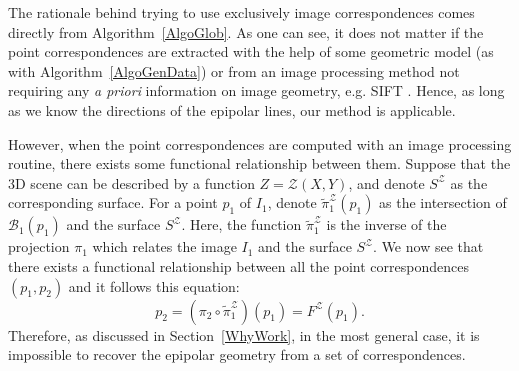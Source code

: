 \documentclass{ipol}
\newcommand{\Bund}[1]{\ensuremath{\mathcal{B}_{#1}}}
\newcommand{\BundO}{\Bund{1}}
\newcommand{\PiZVert}{\widetilde{\pi}_1^{\mathcal{Z}} }
\begin{document}
The rationale behind trying to use exclusively image correspondences comes directly from Algorithm~\ref{AlgoGlob}. As one can see, it does not matter if the point correspondences are extracted with the help of some geometric model (as with Algorithm~\ref{AlgoGenData}) or from an image processing method not requiring any
\emph{a priori} information on image geometry, e.g. SIFT \cite{lowe2004distinctive}. Hence, as long as we know the directions of the epipolar lines, our method is applicable.

However, when the point correspondences are computed with an image processing routine,
 there exists some functional relationship between them. Suppose that the 3D scene can be described by a function $Z=\mathcal{Z}(X,Y)$, and denote $S^\mathcal{Z}$ as the corresponding surface. For a point $p_1$ of $I_1$, denote $ \PiZVert (p_1)$ as the intersection of  $\BundO(p_1)$ and the surface  $S^\mathcal{Z}$. Here, the function $\PiZVert$ is the inverse of the projection  $\pi_1$ which relates the image $I_1$ and the surface $S^\mathcal{Z}$. We now see that there exists a functional relationship between all the point correspondences $(p_1,p_2)$ and it follows this equation:
\begin{equation}
   p_2 = (\pi_2 \circ  \PiZVert) (p_1) = F^\mathcal{Z}(p_1).
\end{equation}
Therefore, as discussed in Section~\ref{WhyWork}, in the most general
case, it is impossible to recover the epipolar geometry from a set of correspondences.
%



%
\end{document}

